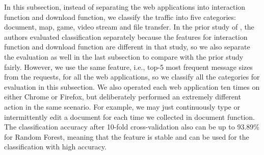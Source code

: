 In this subsection, instead of separating the web applications into interaction function and download function, we classify the traffic into five categories: document, map, game, video stream and file transfer. In the prior study of \cite{TFT14}, the authors evaluated classification separately because the features for interaction function and download function are different in that study, so we also separate the evaluation as well in the last subsection to compare with the prior study fairly. However, we use the same feature, i.e., top-5 most frequent message sizes from the requests, for all the web applications, so we classify all the categories for evaluation in this subsection. We also operated each web application ten times on either Chrome or Firefox, but deliberately performed an extremely different action in the same scenario. For example, we may just continuously type or intermittently edit a document for each time we collected in document function. The classification accuracy after 10-fold cross-validation also can be up to 93.89\% for Random Forest, meaning that the feature is stable and can be used for the classification with high accuracy. 

